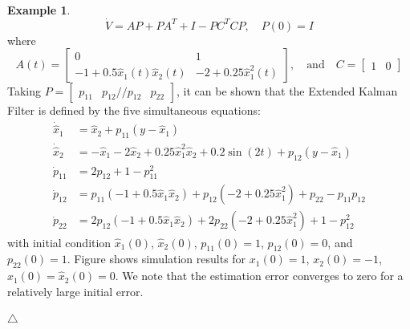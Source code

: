 \documentclass[11pt,a4paper,oneside]{book}
\numberwithin{equation}{section}
\theoremstyle{it}
\theoremstyle{definition}
\newtheorem{example}{Example}[section]
\begin{document}
\begin{example}
\begin{equation*}
	\dot{V}=AP+PA^T+I-PC^TCP,\quad P(0)=I
\end{equation*}
where 
\begin{equation*}
	A(t)=\begin{bmatrix}
		0&1\\[6pt]-1+0.5\hat{x}_1(t)\hat{x}_2(t)&-2+0.25\hat{x}_1^2(t)	\end{bmatrix},\quad\text{and}\quad
	C=\begin{bmatrix} 1&0 \end{bmatrix}	
\end{equation*}
Taking $P=\begin{bmatrix} p_{11} & p_{12} // p_{12} & p_{22} \end{bmatrix}$, it can be shown that the Extended Kalman Filter is defined by the five simultaneous equations:
\begin{equation}
	\begin{aligned}
		\dot{\hat{x}}_1 &= \hat{x}_2+p_{11}(y-\hat{x}_1) \\[6pt]
		\dot{\hat{x}}_2 &= -\hat{x}_1 -2\hat{x}_2+0.25\hat{x}_1^2\hat{x}_2+0.2\sin(2t)+p_{12}(y-\hat{x}_1) \\[6pt]
		\dot{p}_{11} &= 2p_{12}+1-p_{11}^2 \\[6pt]
		\dot{p}_{12} &= p_{11}(-1+0.5\hat{x}_1\hat{x}_2)+p_{12}(-2+0.25\hat{x}_1^2)+p_{22}-p_{11}p_{12} \\[6pt]
		\dot{p}_{22} &= 2p_{12}(-1+0.5\hat{x}_1\hat{x}_2)+2p_{22}(-2+0.25\hat{x}_1^2)+1-p_{12}^2
	\end{aligned}
\end{equation}
with initial condition $\hat{x}_1(0)$, $\hat{x}_2(0)$, $p_{11}(0)=1$, $p_{12}(0)=0$, and $p_{22}(0)=1$. Figure shows simulation results for $x_1(0)=1$, $x_2(0)=-1$, $\hat{x}_1(0)=\hat{x}_2(0)=0$. We note that the estimation error converges to zero for a relatively large initial error.

\hfill$\triangle$
\end{example}
\end{document}
